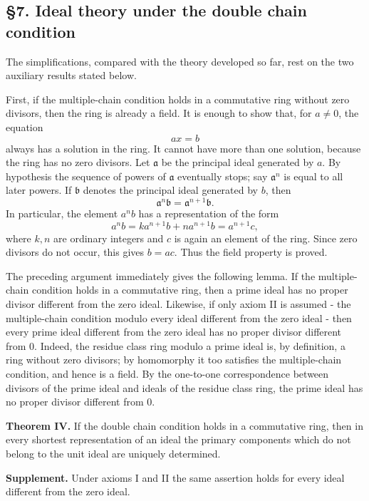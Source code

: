 \documentclass[11pt]{article}
\begin{document}
\subsection{§7. Ideal theory under the double chain
condition}\label{ideal-theory-under-the-double-chain-condition}

The simplifications, compared with the theory developed so far, rest on
the two auxiliary results stated below.

First, if the multiple-chain condition holds in a commutative ring
without zero divisors, then the ring is already a field. It is enough to
show that, for \(a\ne0\), the equation \[
  ax=b
\] always has a solution in the ring. It cannot have more than one
solution, because the ring has no zero divisors. Let \(\mathfrak a\) be
the principal ideal generated by \(a\). By hypothesis the sequence of
powers of \(\mathfrak a\) eventually stops; say \(\mathfrak a^n\) is
equal to all later powers. If \(\mathfrak b\) denotes the principal
ideal generated by \(b\), then \[
  \mathfrak a^n\mathfrak b=\mathfrak a^{n+1}\mathfrak b.
\] In particular, the element \(a^n b\) has a representation of the form
\[
  a^n b = k a^{n+1}b+n a^{n+1}b = a^{n+1}c,
\] where \(k,n\) are ordinary integers and \(c\) is again an element of
the ring. Since zero divisors do not occur, this gives \(b=ac\). Thus
the field property is proved.

The preceding argument immediately gives the following lemma. If the
multiple-chain condition holds in a commutative ring, then a prime ideal
has no proper divisor different from the zero ideal. Likewise, if only
axiom II is assumed - the multiple-chain condition modulo every ideal
different from the zero ideal - then every prime ideal different from
the zero ideal has no proper divisor different from \(0\). Indeed, the
residue class ring modulo a prime ideal is, by definition, a ring
without zero divisors; by homomorphy it too satisfies the multiple-chain
condition, and hence is a field. By the one-to-one correspondence
between divisors of the prime ideal and ideals of the residue class
ring, the prime ideal has no proper divisor different from \(0\).

\textbf{Theorem IV.} If the double chain condition holds in a
commutative ring, then in every shortest representation of an ideal the
primary components which do not belong to the unit ideal are uniquely
determined.

\textbf{Supplement.} Under axioms I and II the same assertion holds for
every ideal different from the zero ideal.
\end{document}
